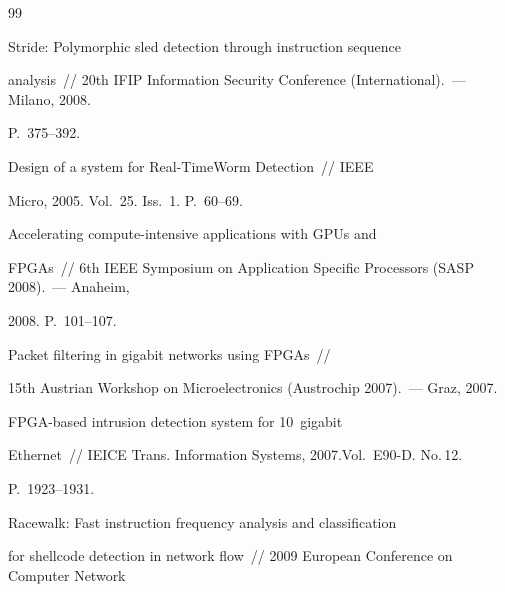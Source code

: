  {\small\frenchspacing


{%




\begin{thebibliography}{99}










 Stride: Polymorphic sled detection through instruction sequence 


analysis~/\!\!/ 20th IFIP Information Security Conference (International).~--- Milano, 2008. 


P.~375--392.




 Design of a system for Real-TimeWorm Detection~/\!\!/ IEEE 


Micro, 2005. Vol.~25. Iss.~1. P.~60--69.




 Accelerating compute-intensive applications with GPUs and 


\mbox{FPGAs}~/\!\!/ 6th IEEE Symposium on Application Specific Processors (SASP 2008).~--- Anaheim, 


2008. P.~101--107.




 Packet filtering in gigabit networks using FPGAs~/\!\!/ 


15th Austrian Workshop on Microelectronics (Austrochip 2007).~--- Graz, 2007.




  FPGA-based intrusion detection system for 10~gigabit 


Ethernet~/\!\!/ IEICE Trans. Information Systems, 2007.\linebreak Vol.~E90-D. No.\,12. 


P.~1923--1931.






Racewalk: Fast instruction frequency analysis and classification 


for shellcode detection in network flow~/\!\!/ 2009 European Conference on Computer Network 



\end{thebibliography}}}
